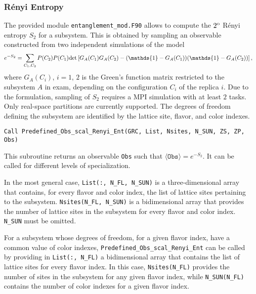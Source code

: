%
\subsubsection{R{\'e}nyi Entropy}
The provided module \texttt{entanglement\_mod.F90} allows to compute the $2^{\rm o}$ R\'enyi entropy $S_2$ for a subsystem.
This is obtained by sampling an observable constructed from two independent simulations of the model \cite{Grover13}
\begin{equation}
e^{-S_2} = \sum_{C_1,C_2} P(C_2) P(C_1) {\rm det}\left[G_A(C_1)G_A(C_2)-(\mathds{1} - G_A(C_1))(\mathds{1} - G_A(C_2))\right],
\label{renyi_obs}
\end{equation}
where $G_A(C_i)$, $i=1$, $2$ is the Green's function matrix restricted to the subsystem $A$ in exam, depending on the configuration $C_i$ of the replica $i$.
Due to the formulation, sampling of $S_2$ requires a MPI simulation with at least $2$ tasks.
Only real-space partitions are currently supported.
The degrees of freedom defining the subsystem are identified by the lattice site, flavor, and color indexes.

\begin{lstlisting}[style=fortran]
Call Predefined_Obs_scal_Renyi_Ent(GRC, List, Nsites, N_SUN, ZS, ZP, Obs)
\end{lstlisting}
This subroutine returns an observable \texttt{Obs} such that $\langle\texttt{Obs}\rangle=e^{-S_2}$.
It can be called for different levels of specialization.

In the most general case, \texttt{List(:, N\_FL, N\_SUN)} is a three-dimensional array that contains, for every flavor and color index, the list of lattice sites pertaining to the subsystem. \texttt{Nsites(N\_FL, N\_SUN)} is a bidimensional array that provides the number of lattice sites in the subsystem for every flavor and color index. \texttt{N\_SUN} must be omitted.

For a subsystem whose degrees of freedom, for a given flavor index, have a common value of color indexes, \texttt{Predefined\_Obs\_scal\_Renyi\_Ent} can be called by providing in \texttt{List(:, N\_FL)} a bidimensional array that contains the list of lattice sites for every flavor index. In this case, \texttt{Nsites(N\_FL)} provides the number of sites in the subsystem for any given flavor index, while \texttt{N\_SUN(N\_FL)} contains the number of color indexes for a given flavor index.

